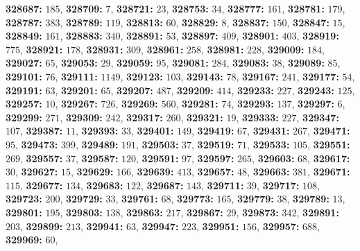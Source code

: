 \textsf{\bfseries 328687:} $185$, \textsf{\bfseries 328709:} $7$, \textsf{\bfseries 328721:} $23$, \textsf{\bfseries 328753:} $34$, \textsf{\bfseries 328777:} $161$, \textsf{\bfseries 328781:} $179$, \textsf{\bfseries 328787:} $383$, \textsf{\bfseries 328789:} $119$, \textsf{\bfseries 328813:} $60$, \textsf{\bfseries 328829:} $8$, \textsf{\bfseries 328837:} $150$, \textsf{\bfseries 328847:} $15$, \textsf{\bfseries 328849:} $161$, \textsf{\bfseries 328883:} $340$, \textsf{\bfseries 328891:} $53$, \textsf{\bfseries 328897:} $409$, \textsf{\bfseries 328901:} $403$, \textsf{\bfseries 328919:} $775$, \textsf{\bfseries 328921:} $178$, \textsf{\bfseries 328931:} $309$, \textsf{\bfseries 328961:} $258$, \textsf{\bfseries 328981:} $228$, \textsf{\bfseries 329009:} $184$, \textsf{\bfseries 329027:} $65$, \textsf{\bfseries 329053:} $29$, \textsf{\bfseries 329059:} $95$, \textsf{\bfseries 329081:} $284$, \textsf{\bfseries 329083:} $38$, \textsf{\bfseries 329089:} $85$, \textsf{\bfseries 329101:} $76$, \textsf{\bfseries 329111:} $1149$, \textsf{\bfseries 329123:} $103$, \textsf{\bfseries 329143:} $78$, \textsf{\bfseries 329167:} $241$, \textsf{\bfseries 329177:} $54$, \textsf{\bfseries 329191:} $63$, \textsf{\bfseries 329201:} $65$, \textsf{\bfseries 329207:} $487$, \textsf{\bfseries 329209:} $414$, \textsf{\bfseries 329233:} $227$, \textsf{\bfseries 329243:} $125$, \textsf{\bfseries 329257:} $10$, \textsf{\bfseries 329267:} $726$, \textsf{\bfseries 329269:} $560$, \textsf{\bfseries 329281:} $74$, \textsf{\bfseries 329293:} $137$, \textsf{\bfseries 329297:} $6$, \textsf{\bfseries 329299:} $271$, \textsf{\bfseries 329309:} $242$, \textsf{\bfseries 329317:} $260$, \textsf{\bfseries 329321:} $19$, \textsf{\bfseries 329333:} $227$, \textsf{\bfseries 329347:} $107$, \textsf{\bfseries 329387:} $11$, \textsf{\bfseries 329393:} $33$, \textsf{\bfseries 329401:} $149$, \textsf{\bfseries 329419:} $67$, \textsf{\bfseries 329431:} $267$, \textsf{\bfseries 329471:} $95$, \textsf{\bfseries 329473:} $399$, \textsf{\bfseries 329489:} $191$, \textsf{\bfseries 329503:} $37$, \textsf{\bfseries 329519:} $71$, \textsf{\bfseries 329533:} $105$, \textsf{\bfseries 329551:} $269$, \textsf{\bfseries 329557:} $37$, \textsf{\bfseries 329587:} $120$, \textsf{\bfseries 329591:} $97$, \textsf{\bfseries 329597:} $265$, \textsf{\bfseries 329603:} $68$, \textsf{\bfseries 329617:} $30$, \textsf{\bfseries 329627:} $15$, \textsf{\bfseries 329629:} $166$, \textsf{\bfseries 329639:} $413$, \textsf{\bfseries 329657:} $48$, \textsf{\bfseries 329663:} $381$, \textsf{\bfseries 329671:} $115$, \textsf{\bfseries 329677:} $134$, \textsf{\bfseries 329683:} $122$, \textsf{\bfseries 329687:} $143$, \textsf{\bfseries 329711:} $39$, \textsf{\bfseries 329717:} $108$, \textsf{\bfseries 329723:} $200$, \textsf{\bfseries 329729:} $33$, \textsf{\bfseries 329761:} $68$, \textsf{\bfseries 329773:} $165$, \textsf{\bfseries 329779:} $38$, \textsf{\bfseries 329789:} $13$, \textsf{\bfseries 329801:} $195$, \textsf{\bfseries 329803:} $138$, \textsf{\bfseries 329863:} $217$, \textsf{\bfseries 329867:} $29$, \textsf{\bfseries 329873:} $342$, \textsf{\bfseries 329891:} $203$, \textsf{\bfseries 329899:} $213$, \textsf{\bfseries 329941:} $63$, \textsf{\bfseries 329947:} $223$, \textsf{\bfseries 329951:} $156$, \textsf{\bfseries 329957:} $688$, \textsf{\bfseries 329969:} $60$, 
